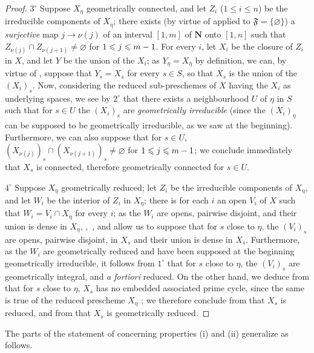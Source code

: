 \begin{proof}
$3^\circ$ Suppose $X_\eta$ geometrically connected, and let $Z_i$ ($1\leqslant i\leqslant n$) be the irreducible components of $X_\eta$; there exists (by virtue of  applied to $\mathfrak F=\{\varnothing\}$) a \emph{surjective} map $j\to\nu(j)$ of an interval $[1,m]$ of $\mathbf{N}$ onto $[1,n]$ such that $Z_{\nu(j)}\cap Z_{\nu(j+1)}\neq\varnothing$ for $1\leqslant j\leqslant m- 1$.
For every $i$, let $X_i$ be the closure of $Z_i$ in $X$, and let $Y$ be the union of the $X_i$; as $Y_\eta=X_\eta$ by definition, we can, by virtue of , suppose that $Y_s=X_s$ for every $s\in S$, so that $X_s$ is the union of the $(X_i)_s$.
Now, considering the reduced sub-preschemes of $X$ having the $X_i$ as underlying spaces, we see by $2^\circ$ that there exists a neighbourhood $U$ of $\eta$ in $S$ such that for $s\in U$ the $(X_i)_s$ are \emph{geometrically irreducible} (since the $(X_i)_\eta$ can be supposed to be geometrically irreducible, as we saw at the beginning).
Furthermore, we can also suppose that for $s\in U$, $(X_{\nu(j)})_s\cap(X_{\nu(j+1)})_s\neq\varnothing$  for $1\leqslant j\leqslant m- 1$; we conclude immediately that $X_s$ is connected, therefore  geometrically connected for $s\in U$.

$4^\circ$ Suppose $X_\eta$ geometrically reduced; let $Z_i$ be the irreducible components of $X_\eta$, and let $W_i$ be the interior of $Z_i$ in $X_\eta$; there is for each $i$ an open $V_i$ of $X$ such that $W_i=V_i\cap X_\eta$ for every $i$; as the $W_i$ are opens, pairwise disjoint, and their union is dense in $X_\eta$, ,~, and  allow us to suppose that for $s$ close to $\eta$, the $(V_i)_s$ are opens, pairwise disjoint, in $X_s$ and their union is dense in $X_s$.
Furthermore, as the $W_i$ are geometrically reduced and have been supposed at the beginning geometrically irreducible, it follows from $1^\circ$ that for $s$ close to $\eta$, the $(V_i)_s$ are geometrically integral, and \emph{a fortiori} reduced.
On the other hand, we deduce from  that for $s$ close to $\eta$, $X_s$ has no embedded associated prime cycle, since the same is true of the reduced prescheme $X_\eta$ ; we therefore conclude from  that $X_s$ is reduced, and from  that $X_s$ is geometrically reduced.
\end{proof}


The parts of the statement of  concerning properties (i) and (ii) generalize as follows.


